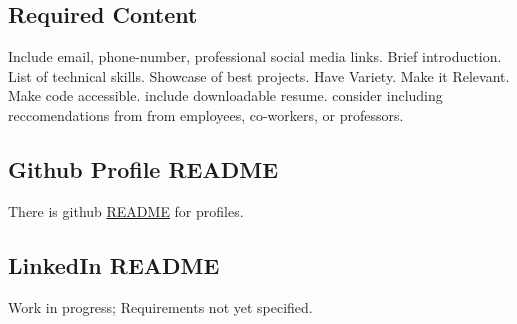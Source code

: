 \documentclass{report}
\begin{document}
	\subsection*{Required Content}
	\begin{outline}
		 Include email, phone-number, professional social media links.
		 Brief introduction.
		\1[Skills:] List of technical skills.
		\1[Projects:] Showcase of best projects.
			\2 Have Variety.
			\2 Make it Relevant.
			\2 Make code accessible.
		\1[Resume:] include downloadable resume.
		\1[Testimonials:] consider including reccomendations from from employees, co-workers, or professors.
	\end{outline}
	\newpage
	\subsection*{Github Profile README}
	There is github \href{https://docs.github.com/en/account-and-profile/how-tos/profile-customization/managing-your-profile-readme}{README} for profiles. 
	\newpage
	\subsection*{LinkedIn README}
	Work in progress; Requirements not yet specified.
	\newpage
	\printbibliography
\end{document}
